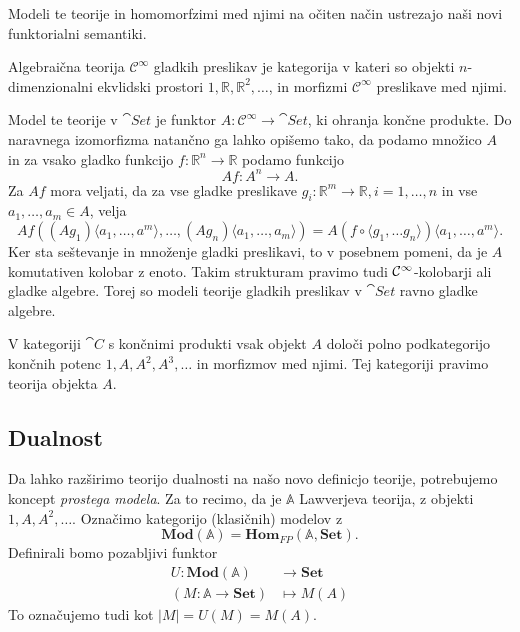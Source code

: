 \documentclass[../kategoricna_logika.tex]{subfiles}
\begin{document}
Modeli te teorije in homomorfzimi med njimi na očiten način ustrezajo naši novi
funktorialni semantiki.
\begin{primer}
Algebraična teorija \(\mathcal{C}^{\infty}\) gladkih preslikav je kategorija
v kateri so objekti $n$-dimenzionalni ekvlidski prostori \(1, \mathbb{R}, \mathbb{R}^2, \ldots\),
in morfizmi \(\mathcal{C}^{\infty}\) preslikave med njimi.

Model te teorije v \(\cat{Set}\) je funktor \(A : \mathcal{C}^{\infty} \to \cat{Set}\),
ki ohranja končne produkte. Do naravnega izomorfizma natančno ga lahko opišemo tako, da
podamo množico \(A\) in za vsako gladko funkcijo \(f : \mathbb{R}^n \to \mathbb{R}\)
podamo funkcijo
\[Af : A^n \to A.\]
Za \(Af\) mora veljati, da za vse gladke preslikave
\(g_i : \mathbb{R}^m \to \mathbb{R}, i = 1, \ldots, n\) in vse \(a_1, \ldots, a_m \in A\),
velja
\[ 
   Af \left( (Ag_1)\langle a_1, \ldots, a^m \rangle, \ldots, (Ag_n)\langle a_1, \ldots, a_m \rangle \right) =
   A(f \circ \langle g_1, \ldots g_n \rangle)\langle a_1, \ldots, a^m \rangle.
\]
Ker sta seštevanje in množenje gladki preslikavi, to v posebnem pomeni,
da je \(A\) komutativen kolobar z enoto.
Takim strukturam pravimo tudi $\mathcal{C}\textsuperscript{\(\infty\)}$-kolobarji
ali gladke algebre. Torej so modeli teorije gladkih preslikav v $\cat{Set}$ ravno gladke algebre.
\end{primer}
%
\begin{primer}
V kategoriji \(\cat{C}\) s končnimi produkti vsak objekt \(A\) določi polno podkategorijo
končnih potenc \(1, A, A^2, A^3, \ldots\) in morfizmov med njimi. Tej kategoriji
pravimo teorija objekta \(A\).
\end{primer}
\subsection{Dualnost}
\label{sec:orgef98ac4}
Da lahko razširimo teorijo dualnosti na našo novo definicjo teorije, potrebujemo
koncept \emph{prostega modela}. Za to recimo, da je \(\mathbb{A}\) Lawverjeva teorija,
z objekti \(1, A, A^2, \ldots\). Označimo kategorijo (klasičnih) modelov z
\[ \mathbf{Mod}(\mathbb{A}) = \mathbf{Hom}_{FP}(\mathbb{A}, \mathbf{Set}). \]
Definirali bomo pozabljivi funktor
\begin{align*}
U : \mathbf{Mod}(\mathbb{A}) &\to \mathbf{Set} \\
(M : \mathbb{A} \to \mathbf{Set}) &\mapsto M(A)
\end{align*}
To označujemo tudi kot \(|M| = U(M) = M(A)\).
\end{document}
